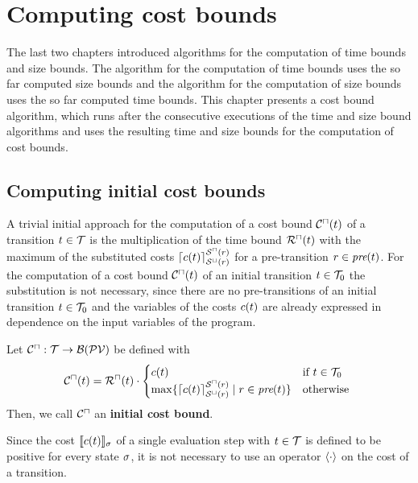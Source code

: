 \section{Computing cost bounds}

The last two chapters introduced algorithms for the computation of time bounds and size bounds.
The algorithm for the computation of time bounds uses the so far computed size bounds and the algorithm for the computation of size bounds uses the so far computed time bounds.
This chapter presents a cost bound algorithm, which runs after the consecutive executions of the time and size bound algorithms and uses the resulting time and size bounds for the computation of cost bounds.

\subsection{Computing initial cost bounds}

A trivial initial approach for the computation of a cost bound ${\mathcal{C}^\sqcap}(t)$ of a transition $t \in \mathcal{T}$ is the multiplication of the time bound ${\mathcal{R}^\sqcap}(t)$ with the maximum of the substituted costs $\lceil c(t) \rceil^{{\mathcal{S}^\sqcap}(r)}_{{\mathcal{S}^\sqcup}(r)}$ for a pre-transition $r \in \emph{pre}(t)$.
For the computation of a cost bound ${\mathcal{C}^\sqcap}(t)$ of an initial transition $t \in \mathcal{T}_0$ the substitution is not necessary, since there are no pre-transitions of an initial transition $t \in \mathcal{T}_0$ and the variables of the costs $c(t)$ are already expressed in dependence on the input variables of the program.

\begin{definition}
  Let ${\mathcal{C}^\sqcap}: \mathcal{T} \rightarrow \mathcal{B}(\mathcal{PV})$ be defined with
  \[ {\mathcal{C}^\sqcap}(t) = {\mathcal{R}^\sqcap}(t) \cdot
  \begin{cases}
    c(t) & \text{if } t \in \mathcal{T}_0 \\
    \max \lbrace \lceil c(t) \rceil^{{\mathcal{S}^\sqcap}(r)}_{{\mathcal{S}^\sqcup}(r)} \mid r \in \emph{pre}(t) \rbrace & \text{otherwise }
  \end{cases}
  \]
  Then, we call ${\mathcal{C}^\sqcap}$ an \textbf{initial cost bound}. 
\end{definition}

Since the cost $\llbracket c(t) \rrbracket_{\sigma}$ of a single evaluation step with $t \in \mathcal{T}$ is defined to be positive for every state $\sigma$, it is not necessary to use an operator $\langle\cdot\rangle$ on the cost of a transition.

